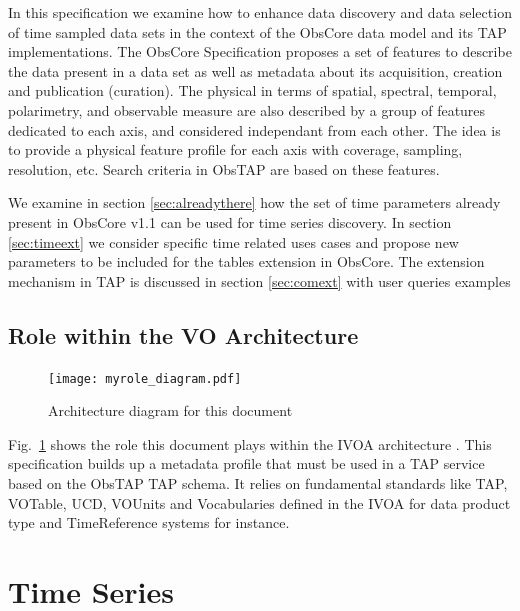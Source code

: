 \documentclass[11pt,a4paper]{ivoa}
\begin{document}
In this specification we examine how to enhance data discovery and data selection of time sampled data sets in the context of the ObsCore data model and its TAP implementations. 
The ObsCore Specification \cite{2017ivoa.spec.0509L} proposes a set of features to describe the data present in a data set as well as metadata about its acquisition, creation and publication (curation).
The physical in terms of spatial, spectral, temporal, polarimetry, and observable measure  are also described by a group of features dedicated to each axis, and considered independant from each other. The idea is to provide a physical feature profile for each axis with coverage, sampling, resolution, etc. 
Search criteria in ObsTAP  are based on these features. 

We examine in section \ref{sec:alreadythere} how the set of time parameters already present in ObsCore v1.1 can be used for time series discovery.
In section \ref{sec:timeext} we consider specific time related uses cases and propose new parameters to be included for the tables extension in ObsCore.
The extension mechanism in TAP is discussed  in section \ref{sec:comext} with user queries examples 

\subsection{Role within the VO Architecture}

\begin{figure}
\centering


\texttt{[image: myrole\_diagram.pdf]}
\caption{Architecture diagram for this document}
\label{fig:archdiag}
\end{figure}

Fig.~\ref{fig:archdiag} shows the role this document plays within the
IVOA architecture \citep{2021ivoa.spec.1101D}. This specification builds up a metadata profile that must be used in a TAP service based on the ObsTAP TAP schema. 
It relies on fundamental  standards like TAP, VOTable, UCD, VOUnits and Vocabularies defined in the IVOA  for data product type and TimeReference systems 
for instance.


\section{Time Series}
\label{sect:metadata}
\end{document}
